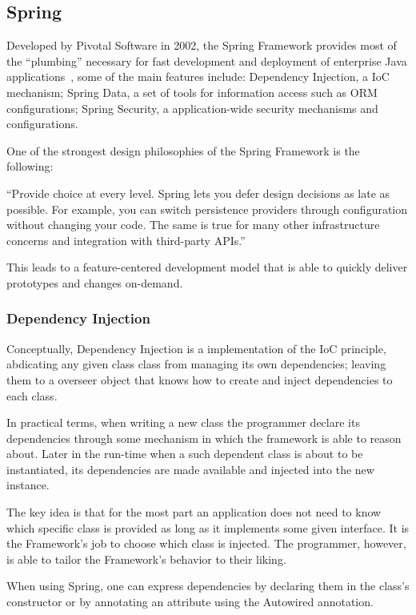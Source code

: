 \subsection{Spring}\label{concept:spring}
Developed by Pivotal Software in 2002, the Spring Framework provides most of the ``plumbing'' necessary for fast development and deployment of enterprise Java applications~\cite{springdocs}, some of the main features include: Dependency Injection, a \gls{IoC} mechanism; Spring Data, a set of tools for information access such as \gls{ORM} configurations; Spring Security, a application-wide security mechanisms and configurations.

One of the strongest design philosophies of the Spring Framework is the following:
\begin{displayquote}
``Provide choice at every level. Spring lets you defer design decisions as late as possible. For example, you can switch persistence providers through configuration without changing your code. The same is true for many other infrastructure concerns and integration with third-party \gls{API}s.''~\cite{springdocs}
\end{displayquote}
This leads to a feature-centered development model that is able to quickly deliver prototypes and changes on-demand.

\subsubsection{Dependency Injection}
Conceptually, Dependency Injection is a implementation of the \gls{IoC} principle, abdicating any given class class from managing its own dependencies; leaving them to a overseer object that knows how to create and inject dependencies to each class\cite{inversion}.

In practical terms, when writing a new class the programmer declare its dependencies through some mechanism in which the framework is able to reason about. Later in the run-time when a such dependent class is about to be instantiated, its dependencies are made available and injected into the new instance.

The key idea is that for the most part an application does not need to know which specific class is provided as long as it implements some given interface. It is the Framework's job to choose which class is injected. The programmer, however, is able to tailor the Framework's behavior to their liking.

When using Spring, one can express dependencies by declaring them in the class's constructor or by annotating an attribute using the Autowired annotation\cite{springdi}.

